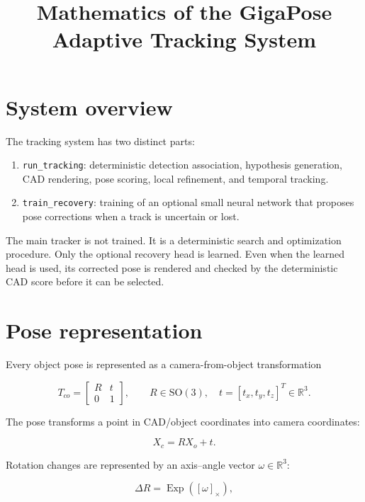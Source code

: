 \documentclass[11pt]{article}
\title{Mathematics of the GigaPose Adaptive Tracking System}
\author{}
\date{}
\newcommand{\R}{\mathbb{R}}
\newcommand{\SO}{\mathrm{SO}}
\newcommand{\Exp}{\operatorname{Exp}}
\begin{document}
\maketitle
\tableofcontents

\section{System overview}

The tracking system has two distinct parts:

\begin{enumerate}
    \item \texttt{run\_tracking}: deterministic detection association,
    hypothesis generation, CAD rendering, pose scoring, local refinement, and
    temporal tracking.
    \item \texttt{train\_recovery}: training of an optional small neural
    network that proposes pose corrections when a track is uncertain or lost.
\end{enumerate}

The main tracker is not trained. It is a deterministic search and optimization
procedure. Only the optional recovery head is learned. Even when the learned
head is used, its corrected pose is rendered and checked by the deterministic
CAD score before it can be selected.

\section{Pose representation}

Every object pose is represented as a camera-from-object transformation

\begin{equation}
T_{co}=
\begin{bmatrix}
R & t\\
0 & 1
\end{bmatrix},
\qquad
R\in\SO(3),\quad
t=[t_x,t_y,t_z]^T\in\R^3.
\end{equation}

The pose transforms a point in CAD/object coordinates into camera coordinates:

\begin{equation}
X_c=RX_o+t.
\end{equation}

Rotation changes are represented by an axis--angle vector
$\omega\in\R^3$:

\begin{equation}
\Delta R=\Exp([\omega]_\times),
\end{equation}
\end{document}
